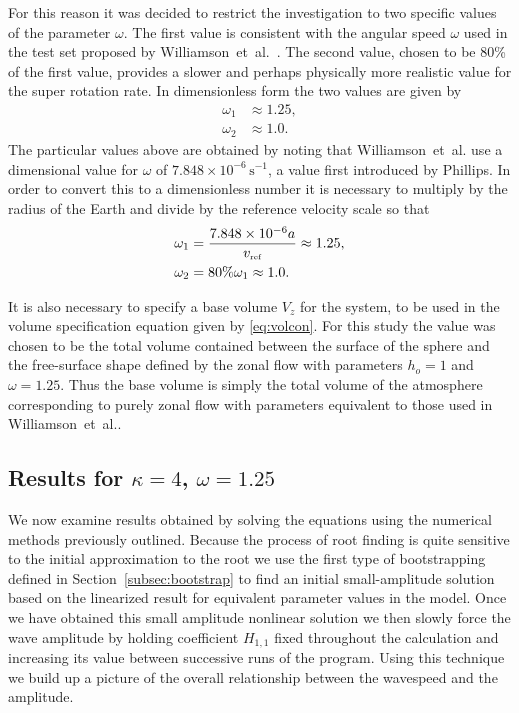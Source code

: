 For this reason it was decided to restrict the investigation to two specific values of the parameter $\omega$. The first value is consistent with the angular speed $\omega$ used in the test set proposed by Williamson~et~al.~\cite{Williamson:STS}. The second value, chosen to be 80\% of the first value,  provides a slower and perhaps physically more realistic value for the super rotation rate. In dimensionless form the two values are given by
\begin{align*}
\omega_1 & \approx 1.25, \\
\omega_2 & \approx 1.0.
\end{align*}
The particular values above are obtained by noting that Williamson~et~al. use a dimensional value for $\omega$ of $7.848\times10^{-6}\,\text{s}^{-1}$, a value first introduced by Phillips\cite{Phillips:NIP}. In order to convert this to a dimensionless number it is necessary to multiply by the radius of the Earth and divide by the reference velocity scale so that
\begin{align*}
\omega_1 & =\frac{7.848\times10^{-6}a}{v_{\mbox{\tiny ref}}}\approx1.25, \\
\omega_2 & = 80\% \omega_1 \approx 1.0.
\end{align*}

It is also necessary to specify a base volume $V_z$ for the system, to be used in the volume specification equation given by \eqref{eq:volcon}. For this study the value was chosen to be the total volume contained between the surface of the sphere and the free-surface shape defined by the zonal flow with parameters $h_o=1$ and $\omega=1.25$. Thus the base volume is simply the total volume of the atmosphere corresponding to purely zonal flow with parameters equivalent to those used in Williamson~et~al.\cite{Williamson:STS}.

\subsection[Results for $\kappa=4$, $\omega=1.25$]{Results for \boldmath$\kappa=4$, $\omega=1.25$}
\label{subsec:incomnlk4w125}
We now examine results obtained by solving the equations using the numerical methods previously outlined. Because the process of root finding is quite sensitive to the initial approximation to the root we use the first type of bootstrapping defined in Section~\ref{subsec:bootstrap} to find an initial small-amplitude solution based on the linearized result for equivalent parameter values in the model. Once we have obtained this small amplitude nonlinear solution we then slowly force the wave amplitude by holding coefficient $H_{1,1}$ fixed throughout the calculation and increasing its value between successive runs of the program. Using this technique we build up a picture of the overall relationship between the wavespeed and the amplitude.

